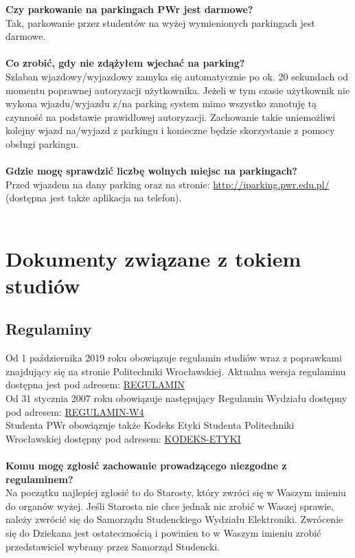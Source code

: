 \documentclass[11pt]{article}
\begin{document}
\textbf{Czy parkowanie na parkingach PWr jest darmowe?}\\
\indent Tak, parkowanie przez studentów na wyżej wymienionych parkingach 
jest darmowe.\\\\
\textbf{Co zrobić, gdy nie zdążyłem wjechać na parking?}\\
\indent Szlaban wjazdowy/wyjazdowy zamyka się automatycznie po ok. 20 sekundach od momentu poprawnej autoryzacji użytkownika. Jeżeli w tym czasie użytkownik nie wykona wjazdu/wyjazdu z/na parking system mimo wszystko zanotuję tą czynność na podstawie prawidłowej autoryzacji. Zachowanie takie uniemożliwi kolejny wjazd na/wyjazd z parkingu i konieczne będzie skorzystanie z pomocy obsługi parkingu.\\\\
\textbf{Gdzie mogę sprawdzić liczbę wolnych miejsc na parkingach?}\\
\indent Przed wjazdem na dany parking oraz na stronie: {\color{blue}\url{http://iparking.pwr.edu.pl/}} (dostępna jest także aplikacja na telefon).\\\\

\newpage
\section{Dokumenty związane z tokiem studiów}
\subsection{Regulaminy}
\indent \hspace{0.5cm} Od 1 października 2019 roku obowiązuje regulamin studiów wraz z poprawkami znajdujący się na stronie Politechniki Wrocławskiej. Aktualna wersja regulaminu dostępna jest pod adresem:
{\color{blue}\href{https://pwr.edu.pl/studenci/organizacja-nauczania/regulamin-studiow}{REGULAMIN}} \\
\indent Od 31 stycznia 2007 roku obowiązuje następujący Regulamin Wydziału dostępny pod adresem: 
{\color{blue}\href{http://weka.pwr.edu.pl/o-wydziale/o-nas/regulamin-wydzialu}{REGULAMIN-W4}} \\
\indent Studenta PWr obowiązuje także Kodeks Etyki Studenta Politechniki Wrocławskiej dostępny pod adresem:
{\color{blue}\href{https://samorzad.pwr.edu.pl/fcp/8GBUKOQtTKlQhbx08SlkTVgJQX2o8DAoHNiwFE1wZDyEPG1gnBVcoFW8SBDRKTxMKRy0SODwBBAEIMQheCFVAORFCHzY/56/public/kodeks-etyki-studenta-pwr.pdf}{KODEKS-ETYKI}} \\\\
\textbf{Komu mogę zgłosić zachowanie prowadzącego niezgodne z regulaminem?} \\
\indent Na początku najlepiej zgłosić to do Starosty, który zwróci się w Waszym imieniu 
do organów wyżej. Jeśli Starosta nie chce jednak nic zrobić w Waszej sprawie, należy zwrócić się \linebreak do Samorządu Studenckiego Wydziału Elektroniki. Zwrócenie 
się do Dziekana jest ostatecznością i powinien to w Waszym imieniu zrobić przedstawiciel wybrany przez Samorząd Studencki. 
\end{document}
